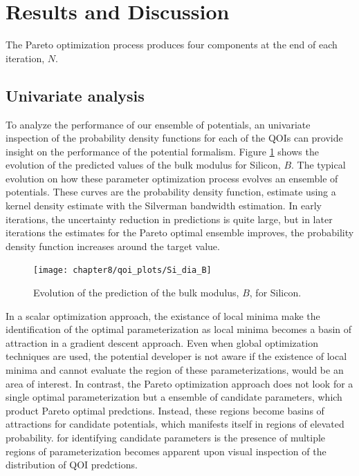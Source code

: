 \section{Results and Discussion}

The Pareto optimization process produces four components at the end of each iteration, $N$.

\subsection{Univariate analysis}
To analyze the performance of our ensemble of potentials, an univariate inspection of the probability density functions for each of the QOIs can provide insight on the performance of the potential formalism.
Figure \ref{fig:Si_qoi_B} shows the evolution of the predicted values of the bulk modulus for Silicon, $B$.  The typical evolution on how these parameter optimization process evolves an ensemble of potentials.
These curves are the probability density function, estimate using a kernel density estimate with the Silverman bandwidth estimation.
In early iterations, the uncertainty reduction in predictions is quite large, but in later iterations the estimates for the Pareto optimal ensemble improves, the probability density function increases around the target value.

\begin{figure}[h]
	\centering
	\texttt{[image: chapter8/qoi\_plots/Si\_dia\_B]}
	\caption{Evolution of the prediction of the bulk modulus, $B$, for Silicon.}
	\label{fig:Si_qoi_B}
\end{figure}

In a scalar optimization approach, the existance of local minima make the identification of the optimal parameterization as local minima becomes a basin of attraction in a gradient descent approach.
Even when global optimization techniques are used, the potential developer is not aware if the existence of local minima and cannot evaluate the region of these parameterizations, would be an area of interest.
In contrast, the Pareto optimization approach does not look for a single optimal parameterization but a ensemble of candidate parameters, which product Pareto optimal predctions.
Instead, these regions become basins of attractions for candidate potentials, which manifests itself in regions of elevated probability.
for identifying candidate parameters is the presence of multiple regions of parameterization becomes apparent upon visual inspection of the distribution of QOI predctions.

